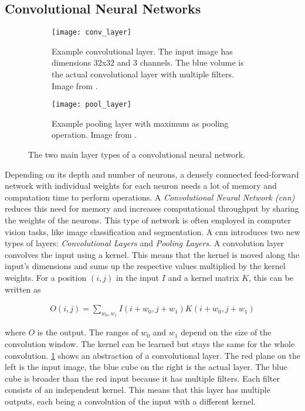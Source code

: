 \subsection{Convolutional Neural Networks}

\begin{figure}[!tbp]
	\centering
	\begin{subfigure}[t]{0.45\textwidth}
		\centering
    	\texttt{[image: conv\_layer]}
    	\caption{Example convolutional layer. The input image has dimensions 32x32 and 3 channels. The blue volume is the actual convolutional layer with multiple filters. Image from \cite{convolutional_layer_image}.}
    	\label{fig:conv_layer}
	\end{subfigure}
	\hfill
	\begin{subfigure}[t]{0.5\textwidth}
		\centering
    	\texttt{[image: pool\_layer]}
    	\caption{Example pooling layer with maximum as pooling operation. Image from \cite{pooling_layer_image}.}
    	\label{fig:pool_layer}
	\end{subfigure}
	\caption{The two main layer types of a convolutional neural network.}
\end{figure} 

Depending on its depth and number of neurons, a densely connected feed-forward network with individual weights for each neuron needs a lot of memory and computation time to perform operations. A \textit{Convolutional Neural Network (\gls{cnn})} reduces this need for memory and increases computational throughput by sharing the weights of the neurons. This type of network is often employed in computer vision tasks, like image classification and segmentation. A \gls{cnn} introduces two new types of layers: \textit{Convolutional Layers} and \textit{Pooling Layers}. A convolution layer convolves the input using a kernel. This means that the kernel is moved along the input's dimensions and sums up the respective values multiplied by the kernel weights. For a position $(i, j)$ in the input $I$ and a kernel matrix $K$, this can be written as

\begin{align}
O(i, j) = \sum\limits_{w_0, w_1} I(i + w_0, j + w_1)K(i + w_0, j + w_1) \label{eqn:convolutional_layer}
\end{align} 

where $O$ is the output. The ranges of $w_0$ and $w_1$ depend on the size of the convolution window.
The kernel can be learned but stays the same for the whole convolution. \fig \ref{fig:conv_layer} shows an abstraction of a convolutional layer. The red plane on the left is the input image, the blue cube on the right is the actual layer. The blue cube is broader than the red input because it has multiple filters. Each filter consists of an independent kernel. This means that this layer has multiple outputs, each being a convolution of the input with a different kernel.

